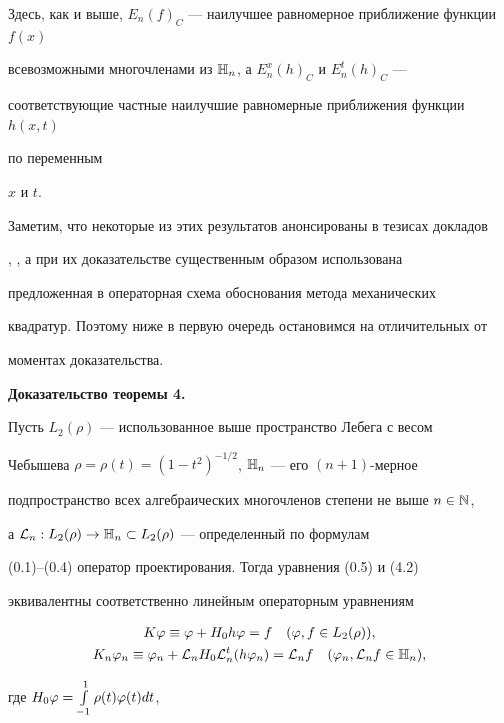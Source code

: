 Здесь, как и выше, $E_n(f)_C$ --- наилучшее равномерное приближение функции $f(x)$


всевозможными многочленами из $\Bbb{H}_n$, а $E_n^x(h)_C$ и $E_n^t(h)_C$ ---


соответствующие частные наилучшие  равномерные приближения функции $h(x,t)$


по переменным


$x$ и $t$.








Заметим, что некоторые из этих результатов анонсированы в тезисах докладов 


\cite{6}, \cite{10}, а при их доказательстве существенным образом использована 


предложенная в \cite{2} операторная схема обоснования метода механических 


квадратур. Поэтому ниже в первую очередь остановимся на отличительных от


\cite{2} моментах доказательства.


\medskip





{\bf Доказательство теоремы 4.} 


Пусть $L_2(\rho)$ --- использованное выше пространство Лебега с весом 


Чебышева $\rho=\rho(t)=(1-t^2)^{-1/2}$, $\Bbb{H}_n$ --- его $(n+1)$-мерное 


подпространство всех алгебраических многочленов степени не выше $n\in \Bbb{N}$,


а ${\cal L}_n:L_2(\rho)\to \Bbb{H}_n\subset L_2(\rho)$ --- определенный по формулам 


(0.1)--(0.4) оператор проектирования. Тогда уравнения (0.5) и (4.2) 


эквивалентны соответственно линейным операторным уравнениям 


\begin{gather}


K\vp \equiv \vp+H_0h\vp=f\quad (\vp,f\in L_2(\rho)), \\


%


K_n\vp_n \equiv \vp_n+\rL_nH_0\rL_n^t(h\vp_n)=\rL_n f


\quad (\vp_n, \rL_n f\in \bH_n),


\end{gather}


где $H_0\varphi=\int\limits_{-1}^{1}\rho(t)\varphi(t)dt$,


